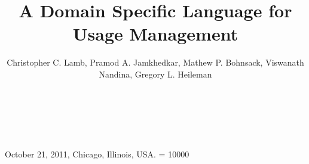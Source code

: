 \documentclass{sig-alternate-11pt}
\begin{document}
\title{A Domain Specific Language for Usage Management}


\author{
\alignauthor
Christopher C. Lamb, Pramod A. Jamkhedkar, Mathew P. Bohnsack, Viswanath Nandina, Gregory L. Heileman \\
       \\
       \\
       \\
}

 {October 21, 2011, Chicago, Illinois, USA.} 
\widowpenalty = 10000

\maketitle









\end{document}
